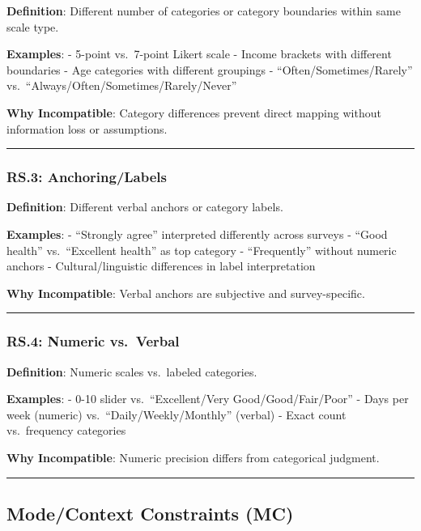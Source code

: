 \documentclass[
  letterpaper,
]{report}
\begin{document}
\textbf{Definition}: Different number of categories or category
boundaries within same scale type.

\textbf{Examples}: - 5-point vs.~7-point Likert scale - Income brackets
with different boundaries - Age categories with different groupings -
``Often/Sometimes/Rarely'' vs.~``Always/Often/Sometimes/Rarely/Never''

\textbf{Why Incompatible}: Category differences prevent direct mapping
without information loss or assumptions.

\begin{center}\rule{0.5\linewidth}{0.5pt}\end{center}

\subsubsection{RS.3: Anchoring/Labels}\label{rs.3-anchoringlabels}

\textbf{Definition}: Different verbal anchors or category labels.

\textbf{Examples}: - ``Strongly agree'' interpreted differently across
surveys - ``Good health'' vs.~``Excellent health'' as top category -
``Frequently'' without numeric anchors - Cultural/linguistic differences
in label interpretation

\textbf{Why Incompatible}: Verbal anchors are subjective and
survey-specific.

\begin{center}\rule{0.5\linewidth}{0.5pt}\end{center}

\subsubsection{RS.4: Numeric vs.~Verbal}\label{rs.4-numeric-vs.-verbal}

\textbf{Definition}: Numeric scales vs.~labeled categories.

\textbf{Examples}: - 0-10 slider vs.~``Excellent/Very
Good/Good/Fair/Poor'' - Days per week (numeric)
vs.~``Daily/Weekly/Monthly'' (verbal) - Exact count vs.~frequency
categories

\textbf{Why Incompatible}: Numeric precision differs from categorical
judgment.

\begin{center}\rule{0.5\linewidth}{0.5pt}\end{center}

\subsection{Mode/Context Constraints
(MC)}\label{modecontext-constraints-mc}
\end{document}
